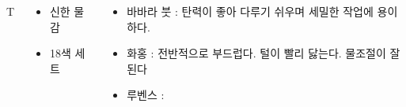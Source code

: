 \documentclass[	20pt, 
							a0paper, 
							landscape, %
							margin=0mm, %
							innermargin=4mm,  		%
							blockverticalspace=4mm, %
							colspace=5mm, 
							subcolspace=0mm
							]{tikzposter}
\begin{document}
\begin{columns}
{		}T


		{
			\setlength{\leftmargini}{4em}			
			\setlength{\labelsep}{1em} %

			\begin{LARGE}
			\begin{itemize}
			\item 신한 물감
			\item 18색 세트
			\end{itemize}
			\end{LARGE}

		}

		{
			\setlength{\leftmargini}{2em}			
			\setlength{\labelsep}{1em} %

			\begin{LARGE}
			\begin{itemize}
			\item 바바라 붓 : 탄력이 좋아 다루기 쉬우며 세밀한 작업에 용이하다.
			\item 화홍 : 전반적으로 부드럽다. 털이 빨리 닳는다. 물조절이 잘 된다
			\item 루벤스 : 

			\end{itemize}
			\end{LARGE}
		}



		{
			\setlength{\leftmargini}{2em}			
			\setlength{\labelsep}{1em} %

}
\end{columns}
\end{document}
